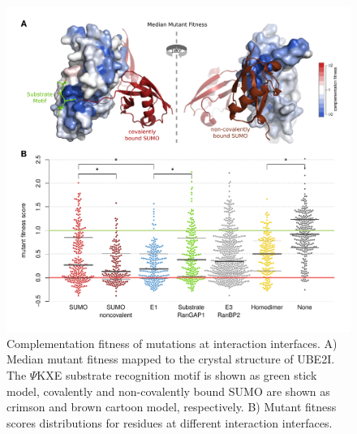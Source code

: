 \begin{figure}[h!]
	\centering
	\includegraphics[width=\textwidth]{img/ube2i_interfaces.pdf}
	\caption{Complementation fitness of mutations at interaction interfaces. A) Median mutant fitness mapped to the crystal structure of UBE2I. The $\Psi$KXE substrate recognition motif is shown as green stick model, covalently and non-covalently bound SUMO are shown as crimson and brown cartoon model, respectively. B) Mutant fitness scores distributions for residues at different interaction interfaces. }
	\label{fig:ube2i_interfaces}
\end{figure}

